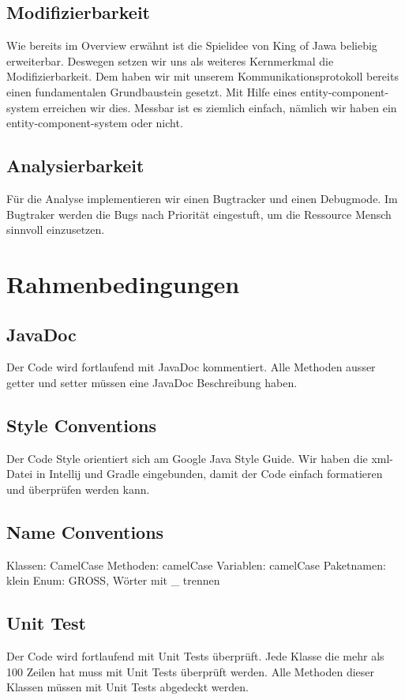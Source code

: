 \documentclass{scrartcl}
\newcommand{\n}{\newline}
\begin{document}
\subsection{Modifizierbarkeit}
Wie bereits im Overview erwähnt ist die Spielidee von King of Jawa beliebig erweiterbar. Deswegen setzen wir uns als weiteres Kernmerkmal die Modifizierbarkeit. Dem haben wir mit unserem Kommunikationsprotokoll bereits  einen fundamentalen Grundbaustein gesetzt. Mit Hilfe eines entity-component-system erreichen wir dies. Messbar ist es ziemlich einfach, nämlich wir haben ein entity-component-system oder nicht.
\subsection{Analysierbarkeit}
Für die Analyse implementieren wir einen Bugtracker und einen Debugmode. Im Bugtraker werden die Bugs nach Priorität eingestuft, um die Ressource Mensch sinnvoll einzusetzen. 

\section{Rahmenbedingungen}
\subsection{JavaDoc}
Der Code wird fortlaufend mit JavaDoc kommentiert.
Alle Methoden ausser getter und setter müssen eine JavaDoc Beschreibung haben.

\subsection{Style Conventions}
Der Code Style orientiert sich am Google Java Style Guide. Wir haben die xml-Datei in Intellij und Gradle eingebunden, damit der Code einfach formatieren und überprüfen werden kann.

\subsection{Name Conventions}
Klassen: CamelCase \n
Methoden: camelCase \n
Variablen: camelCase \n
Paketnamen: klein \n
Enum: GROSS, Wörter mit \_ trennen \n

\subsection{Unit Test}
Der Code wird fortlaufend mit Unit Tests überprüft.
Jede Klasse die mehr als 100 Zeilen hat muss mit Unit Tests überprüft werden. Alle Methoden dieser Klassen müssen mit Unit Tests abgedeckt werden.
\end{document}
